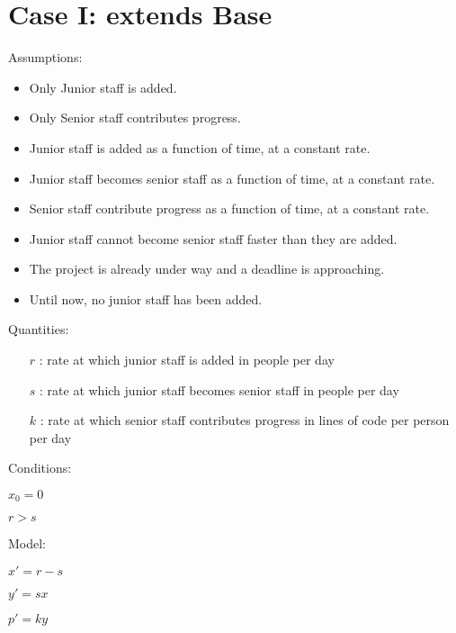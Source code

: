 \documentclass{article}
\newenvironment{atomize}
    {\begin{list} {} {
            \setlength\itemindent{0pt}
            \setlength\leftmargin{10pt}
            \setlength\labelwidth{0pt}
    }}
    {\end{list}}
\begin{document}
\section*{Case I: extends Base}
  \begin{atomize}
    \item Assumptions:
      \begin{itemize}
        \item Only Junior staff is added.
				\item Only Senior staff contributes progress.
				\item Junior staff is added as a function of time, at a constant rate.
				\item Junior staff becomes senior staff as a function of time, at a
				constant rate.
				\item Senior staff contribute progress as a function of time, at a
				constant rate.
				\item Junior staff cannot become senior staff faster than they are
				added.
				\item The project is already under way and a deadline is approaching.
				\item Until now, no junior staff has been added.
      \end{itemize}

		\item Quantities: \begin{itemize} \item [$r$]: rate at which junior staff is
		added in people per day \item [$s$]: rate at which junior staff becomes
		senior staff in people per day \item [$k$]: rate at which senior staff
		contributes progress in lines of code per person per day \end{itemize}

  \item Conditions:
  	\begin{atomize}
    	\item $x_{0} = 0$
    	\item $r > s$
  	\end{atomize}

    \item Model:
      \begin{atomize}
        \item $x\prime = r - s$
        \item $y\prime = sx$
        \item $p\prime = ky$
      \end{atomize}


\end{atomize}
\end{document}
